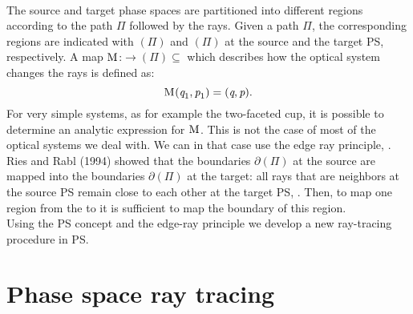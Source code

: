 \\ \indent The source and target phase spaces are partitioned into different regions according to the path $\Pi$ followed by the rays. 
Given a path $\Pi$, the corresponding regions are indicated with $(\Pi)$ and $(\Pi)$ at the source and the target PS, respectively. 
A map $\mathrm{M}_{\textit{}}$:$\rightarrow$$(\Pi)\subseteq$ which describes how the optical system changes the rays is defined as:
\begin{equation}\label{M}
\mathrm{M}_{\textit{}}(\textit{q}_1,\textit{p}_1)=(\textit{q}, \textit{p}).
\end{equation} 
For very simple systems, as for example the two-faceted cup, it is possible to determine an analytic expression for $\mathrm{M}_{\textit{}}$.
This is not the case of most of the optical systems we deal with. 
We can in that case use the edge ray principle, \cite{welford1978problem}.
Ries and Rabl (1994) showed that the boundaries 
$\partial$$(\Pi)$ at the source are mapped into the boundaries $\partial$$(\Pi)$ at the target: all rays that are neighbors at the source PS remain close to each other at the target PS, \cite{Ries:2}. Then, to map one region from the  to  it is sufficient to map the boundary of this region.
\\ \indent Using the PS concept and the edge-ray principle we develop a new ray-tracing procedure in PS.
\section{Phase space ray tracing}
 

